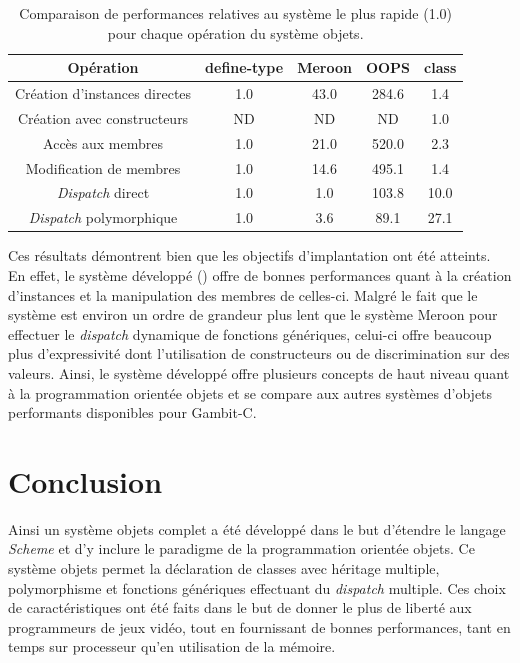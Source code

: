 \documentclass[12pt,twoside,letterpaper,francais]{book}
\newcommand{\Schemelang}{{\textit{Scheme }}}
\newcommand{\scheme}[1]{\selectlanguage{english}{\tt #1}\selectlanguage{french}}
\begin{document}
\begin{table}
  \center
  \begin{tabular}{ccccc}
    \hline
    Opération & define-type & Meroon & OOPS & class \\
    \hline \hline
    Création d'instances directes & 1.0 & 43.0 & 284.6 & 1.4 \\
    Création avec constructeurs & ND & ND & ND & 1.0 \\
    Accès aux membres & 1.0 & 21.0 & 520.0 & 2.3 \\
    Modification de membres & 1.0 & 14.6 & 495.1 & 1.4 \\
    \textit{Dispatch} direct & 1.0 & 1.0 & 103.8 & 10.0 \\
    \textit{Dispatch} polymorphique & 1.0 & 3.6 & 89.1 & 27.1 \\
    \hline
  \end{tabular}
  \caption{Comparaison de performances relatives au système le plus
    rapide (1.0) pour chaque opération du système objets.}
  \label{OO:bench-rel}
\end{table}

Ces résultats démontrent bien que les objectifs d'implantation ont été
atteints. En effet, le système développé (\scheme{class}) offre de
bonnes performances quant à la création d'instances et la manipulation
des membres de celles-ci. Malgré le fait que le système est environ un
ordre de grandeur plus lent que le système Meroon pour effectuer le
\textit{dispatch} dynamique de fonctions génériques, celui-ci offre
beaucoup plus d'expressivité dont l'utilisation de constructeurs ou de
discrimination sur des valeurs. Ainsi, le système développé offre
plusieurs concepts de haut niveau quant à la programmation orientée
objets et se compare aux autres systèmes d'objets performants
disponibles pour Gambit-C.

\FloatBarrier
\section{Conclusion}
Ainsi un système objets complet a été développé dans le but d'étendre
le langage \Schemelang et d'y inclure le paradigme de la programmation
orientée objets. Ce système objets permet la déclaration de classes avec
héritage multiple, polymorphisme et fonctions génériques effectuant du
\textit{dispatch} multiple. Ces choix de caractéristiques ont été
faits dans le but de donner le plus de liberté aux programmeurs de
jeux vidéo, tout en fournissant de bonnes performances, tant en temps
sur processeur qu'en utilisation de la mémoire.
\end{document}
